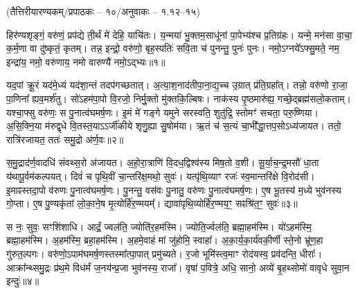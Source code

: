 
\vspace{-1ex}
\centerline{\normalsize (तैत्तिरीयारण्यकम्/प्रपाठकः – १०/अनुवाकः – १.१२–१५)}

हिर॑ण्यशृङ्गं॒ वरु॑णं॒ प्रप॑द्ये ती॒र्थं मे॑ देहि॒ याचि॑तः। य॒न्मया॑ भु॒क्तम॒साधू॑नां पा॒पेभ्य॑श्च प्र॒तिग्र॑हः। यन्मे॒ मन॑सा वा॒चा॒ क॒र्म॒णा वा दु॑ष्कृतं॒ कृतम्। तन्न॒ इन्द्रो॒ वरु॑णो॒ बृह॒स्पतिः॑ सवि॒ता च॑ पुनन्तु॒ पुनः॑ पुनः। नमो॒ऽग्नये᳚ऽफ्सु॒मते॒ नम॒ इन्द्रा॑य॒ नमो॒ वरु॑णाय॒ नमो वारुण्यै॑ नमो॒ऽद्भ्यः॥१॥

 यद॒पां क्रू॒रं यद॑मे॒ध्यं यद॑शा॒न्तं तदप॑गच्छतात्। अ॒त्या॒श॒नाद॑ती\-पा॒ना॒द्य॒च्च उ॒ग्रात् प्र॑ति॒ग्रहा᳚त्। तन्नो॒ वरु॑णो रा॒जा॒ पा॒णिना᳚ ह्यव॒मर्\mbox{}श॑तु। सो॑ऽहम॑पा॒पो वि॒रजो॒ निर्मु॒क्तो मु॑क्तकि॒ल्बिषः। नाक॑स्य पृ॒ष्ठमारु॑ह्य॒ गच्छे॒द्ब्रह्म॑सलो॒कताम्। यश्चा॒फ्सु वरु॑णः॒ स पु॒नात्व॑घमर्\mbox{}ष॒णः। इ॒मं मे॑ गङ्गे यमुने सरस्वति॒ शुतु॑द्रि॒ स्तोमꣳ॑ सचता॒ परु॒ष्णिया। अ॒सि॒क्नि॒या म॑रुद्\mbox{}वृधे वि॒तस्त॒याऽऽर्जी॑कीये शृणु॒ह्या सु॒षोम॑या। ऋ॒तं च॑ स॒त्यं चा॒भी᳚द्धा॒त्तप॒सोऽध्य॑जायत। ततो॒ रात्रि॑रजायत॒ ततः॑ समु॒द्रो अ॑र्ण॒वः॥२॥
 
 स॒मु॒द्राद॑र्ण॒वादधि॑ संवथ्स॒रो अ॑जायत। अ॒हो॒रा॒त्राणि॑ वि॒दध॒द्विश्व॑स्य मिष॒तो व॒शी। सू॒र्या॒च॒न्द्र॒मसौ॑ धा॒ता य॑थापू॒र्वम॑कल्पयत्। दिवं॑ च पृथि॒वीं चा॒न्तरि॑क्ष॒मथो॒ सुवः॑। यत्पृ॑थि॒व्याꣳ रजः॑ स्व॒मान्तरि॑क्षे वि॒रोद॑सी। इ॒माꣴस्तदा॒पो व॑रुणः पु॒नात्व॑घमर्\mbox{}ष॒णः। पु॒नन्तु॒ वस॑वः पु॒नातु॒ वरु॑णः पु॒नात्व॑घमर्\mbox{}ष॒णः। ए॒ष भू॒तस्य॑ म॒ध्ये भुव॑नस्य गो॒प्ता। ए॒ष पु॒ण्यकृ॑तां लो॒का॒ने॒ष मृ॒त्योर्\mbox{}हि॑र॒ण्मयम्᳚। द्यावा॑पृथि॒व्योर्\mbox{}हि॑र॒ण्मय॒ꣳ॒ सꣴश्रि॑त॒ꣳ॒ सुवः॑॥३॥

स नः॒ सुवः॒ सꣳशि॑शाधि। आर्द्रं॒ ज्वल॑ति॒ ज्योति॑र॒हम॑स्मि। ज्योति॒र्ज्वल॑ति॒ ब्रह्मा॒हम॑स्मि। यो॑ऽहम॑स्मि॒ ब्रह्मा॒हम॑स्मि। अ॒हम॑स्मि॒ ब्रहा॒हम॑स्मि। अ॒हमे॒वाहं मां जु॑होमि॒ स्वाहा᳚।
 अ॒का॒र्य॒का॒र्य॑वकी॒र्णी स्ते॒नो भ्रू॑ण॒हा गु॑रुत॒ल्पगः। वरु॑णो॒ऽपाम॑घ\-मर्\mbox{}ष॒णस्तस्मा᳚त्पा॒पात् प्रमु॑च्यते। र॒जो भूमि॑स्त्व॒माꣳ रोद॑यस्व॒ प्रव॑दन्ति॒ धीराः᳚। आक्रा᳚न्थ्समु॒द्रः प्र॑थ॒मे विध॑र्मं ज॒नय॑न्प्र॒जा भुव॑नस्य॒ राजा᳚। वृषा॑ प॒वित्रे॒ अधि॒ सानो॒ अव्ये॑ बृ॒हथ्सोमो॑ वावृधे सुवा॒न इन्दुः॑॥४॥